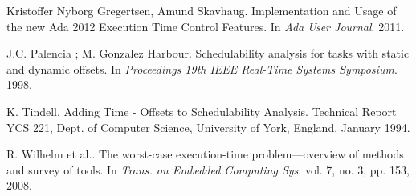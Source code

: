 \documentclass{article}
\begin{document}
\begin{thebibliography}{1}
Kristoffer Nyborg Gregertsen, Amund Skavhaug.
\newblock Implementation and Usage of the new Ada 2012 Execution Time Control Features.
\newblock In {\em Ada User Journal}. 2011.

J.C. Palencia ; M. Gonzalez Harbour.
\newblock Schedulability analysis for tasks with static and dynamic offsets.
\newblock In {\em Proceedings 19th IEEE Real-Time Systems Symposium}. 1998.

K. Tindell.
\newblock Adding Time - Offsets to Schedulability Analysis.
\newblock Technical Report YCS 221, Dept. of Computer Science, University of York, England, January 1994.

R. Wilhelm et al..
\newblock The worst-case execution-time problem—overview of methods and survey of tools.
\newblock In {\em Trans. on Embedded Computing Sys}. vol. 7, no. 3, pp. 153, 2008.

\end{thebibliography}
\end{document}

